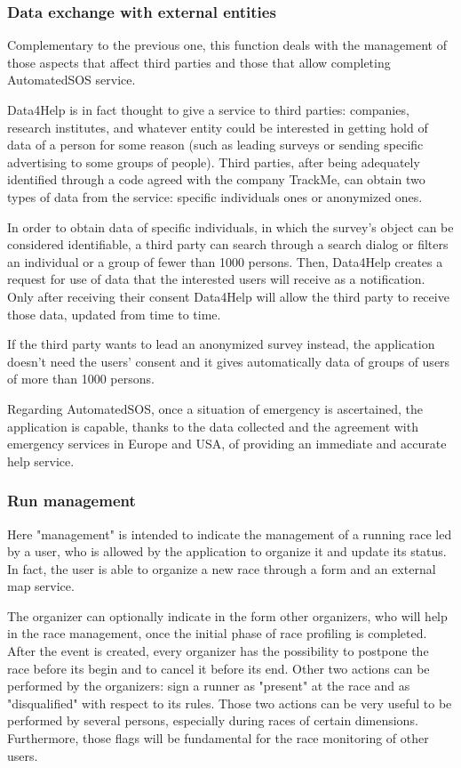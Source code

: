 \subsubsection{Data exchange with external entities}
Complementary to the previous one, this function deals with the management of those aspects that affect third parties and those that allow completing AutomatedSOS service.

Data4Help is in fact thought to give a service to third parties: companies, research institutes, and whatever entity could be interested in getting hold of data of a person for some reason (such as leading surveys or sending specific advertising to some groups of people). Third parties, after being adequately identified through a code agreed with the company TrackMe, can obtain two types of data from the service: specific individuals ones or anonymized ones.

In order to obtain data of specific individuals, in which the survey's object can be considered identifiable, a third party can search through a search dialog or filters an individual or a group of fewer than 1000 persons. Then, Data4Help creates a request for use of data that the interested users will receive as a notification. Only after receiving their consent Data4Help will allow the third party to receive those data, updated from time to time.

If the third party wants to lead an anonymized survey instead, the application doesn't need the users' consent and it gives automatically data of groups of users of more than 1000 persons.

Regarding AutomatedSOS, once a situation of emergency is ascertained, the application is capable, thanks to the data collected and the agreement with emergency services in Europe and USA, of providing an immediate and accurate help service. 

\subsubsection{Run management} 
Here "management" is intended to indicate the management of a running race led by a user, who is allowed by the application to organize it and update its status. In fact, the user is able to organize a new race through a form and an external map service.

The organizer can optionally indicate in the form other organizers, who will help in the race management, once the initial phase of race profiling is completed. After the event is created, every organizer has the possibility to postpone the race before its begin and to cancel it before its end. Other two actions can be performed by the organizers: sign a runner as "present" at the race and as "disqualified" with respect to its rules. Those two actions can be very useful to be performed by several persons, especially during races of certain dimensions. Furthermore, those flags will be fundamental for the race monitoring of other users.

